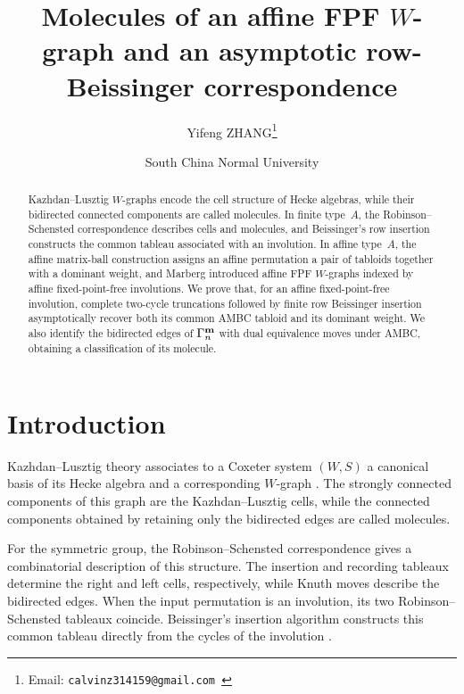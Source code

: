 \documentclass[11pt]{article}
\begin{document}
\title{Molecules of an affine FPF $W$-graph and an asymptotic row-Beissinger correspondence}
\author{
Yifeng ZHANG\thanks{
Email: \tt calvinz314159@gmail.com
}
}
\date{South China Normal University}



\maketitle

\begin{abstract}
Kazhdan--Lusztig $W$-graphs encode the cell structure of Hecke algebras, while their bidirected connected components are called molecules.
In finite type~$A$, the Robinson--Schensted correspondence describes cells and molecules, and Beissinger's row insertion constructs the common tableau associated with an involution.
In affine type~$A$, the affine matrix-ball construction assigns an affine permutation a pair of tabloids together with a dominant weight, and Marberg introduced affine FPF $W$-graphs indexed by affine fixed-point-free involutions.
We prove that, for an affine fixed-point-free involution, complete two-cycle truncations followed by finite row Beissinger insertion asymptotically recover both its common AMBC tabloid and its dominant weight.
We also identify the bidirected edges of $\Gamma_n^{\mathbf{m}}$ with dual equivalence moves under AMBC, obtaining a classification of its molecule.

\end{abstract}

\setcounter{tocdepth}{2}
\tableofcontents

\section{Introduction}

Kazhdan--Lusztig theory associates to a Coxeter system
$(W,S)$ a canonical basis of its Hecke algebra and a
corresponding $W$-graph \cite{KL}.  The strongly connected
components of this graph are the Kazhdan--Lusztig cells, while
the connected components obtained by retaining only the
bidirected edges are called molecules.

For the symmetric group, the Robinson--Schensted
correspondence gives a combinatorial description of this
structure.  The insertion and recording tableaux determine the
right and left cells, respectively, while Knuth moves describe
the bidirected edges.  When the input permutation is an
involution, its two Robinson--Schensted tableaux coincide.
Beissinger's insertion algorithm constructs this common
tableau directly from the cycles of the involution
\cite{Beissinger}.
\end{document}
